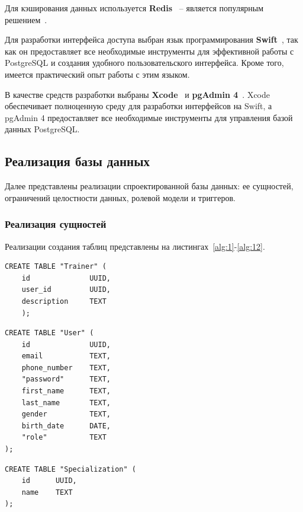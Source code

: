 Для кэширования данных используется  \textbf{Redis}~\cite{redis} -- является популярным решением~\cite{DBEnginesRanking}.

Для разработки интерфейса доступа выбран язык программирования \textbf{Swift}~\cite{swift}, так как он предоставляет все необходимые инструменты для эффективной работы с PostgreSQL и создания удобного пользовательского интерфейса. Кроме того, имеется практический опыт работы с этим языком.

В качестве средств разработки выбраны \textbf{Xcode}~\cite{xcode} и \textbf{pgAdmin 4}~\cite{pgadmin4}. Xcode обеспечивает полноценную среду для разработки интерфейсов на Swift, а pgAdmin 4 предоставляет все необходимые инструменты для управления базой данных PostgreSQL.

\subsection{Реализация базы данных}

Далее представлены реализации спроектированной базы данных: ее сущностей, ограничений целостности данных, ролевой модели и триггеров.

\subsubsection*{Реализация сущностей}

Реализации создания таблиц представлены на листингах~\ref{alg:1}-\ref{alg:12}.

\begin{lstlisting}[label=alg:1, caption=Реализация создания отношения Trainer, captionpos=t]
	CREATE TABLE "Trainer" (
	id 				UUID,
	user_id			UUID,
	description 	TEXT
	);
\end{lstlisting}

\begin{lstlisting}[label=alg:0, caption=Реализация создания отношения User, captionpos=t]
CREATE TABLE "User" (
	id 				UUID,
	email 			TEXT,
	phone_number 	TEXT,
	"password" 		TEXT,
	first_name 		TEXT,
	last_name 		TEXT,
	gender 			TEXT,
	birth_date 		DATE,
	"role"			TEXT
);
\end{lstlisting}

\begin{lstlisting}[label=alg:13, caption=Реализация создания отношения Specialization, captionpos=t]
CREATE TABLE "Specialization" (
	id	 	UUID,
	name 	TEXT
);
\end{lstlisting}


